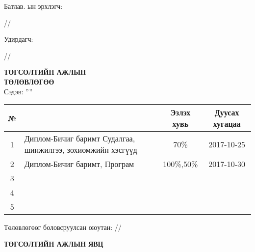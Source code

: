 
\begin{titlepage}

\vspace*{0.5cm}
Батлав. \deptname ын эрхлэгч: 
\begin{flushright}
\makebox[4cm]{\dotfill} /\chairname/ 
\end{flushright}

Удирдагч: 
\begin{flushright}
\makebox[4cm]{\dotfill} /\supname/
\end{flushright}

\begin{center}

\vspace*{2cm}
\textbf{{\large ТӨГСӨЛТИЙН АЖЛЫН \\ ТӨЛӨВЛӨГӨӨ}}\\[0.5cm]

\textsc{\large Сэдэв: ''\ttitle''}\\[0.5cm]

\begin{tabular}{|c|p{7cm}|c|c|}
	\hline
	№ & \makebox[7cm][c]{Ажлын бүлэг, хэсгийн нэр} & Эзлэх хувь & Дуусах хугацаа \\ \hline
	1 & {Диплом-Бичиг баримт Судалгаа, шинжилгээ, зохиомжийн хэсгүүд} &  70\% & 2017-10-25 \\ \hline
	2 & {Диплом-Бичиг баримт, Програм}     & 100\%,50\% & 2017-10-30 \\ \hline
	3 & {} &  &  \\ \hline
	4 & {} &  &  \\ \hline
	5 & {} &  &  \\ \hline
\end{tabular}

\vspace{2cm}
Төлөвлөгөөг боловсруулсан оюутан: \makebox[3cm]{\dotfill} /\shortname/

\end{center}

\newpage

\begin{center}

\vspace*{2cm}
\textbf{{\large ТӨГСӨЛТИЙН АЖЛЫН ЯВЦ}}\\[0.5cm]


\end{center}
\end{titlepage}
